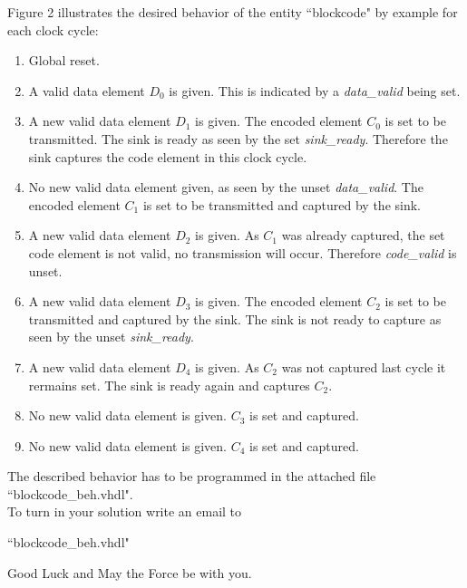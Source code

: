 \documentclass[a4paper,12pt]{article}
\begin{document}
Figure 2 illustrates the desired behavior of the entity ``blockcode" by example for each clock cycle:
\begin{enumerate}
\item Global reset.
\item A valid data element $D_0$ is given. This is indicated by a \textit{data\_valid} being set.
\item A new valid data element $D_1$ is given. The encoded element $C_0$ is set to be transmitted. The sink is ready as seen by the set \textit{sink\_ready}. Therefore the sink captures the code element in this clock cycle.
\item No new valid data element given, as seen by the unset \textit{data\_valid}. The encoded element $C_1$ is set to be transmitted and captured by the sink.
\item A new valid data element $D_2$ is given. As $C_1$ was already captured, the set code element is not valid, no transmission will occur. Therefore \textit{code\_valid} is unset.
\item A new valid data element $D_3$ is given. The encoded element $C_2$ is set to be transmitted and captured by the sink. The sink is not ready to capture as seen by the unset \textit{sink\_ready}.
\item A new valid data element $D_4$ is given. As $C_2$ was not captured last cycle it rermains set. The sink is ready again and captures $C_2$.
\item No new valid data element is given. $C_3$ is set and captured.
\item No new valid data element is given. $C_4$ is set and captured.
\end{enumerate}


\vspace{2.5cm}
The described  behavior has to be programmed in the attached file ``blockcode\_beh.vhdl".\\

To turn in your solution write an email to %

``blockcode\_beh.vhdl"

\vspace{0.7cm}
Good Luck and May the Force be with you.
\end{document}
